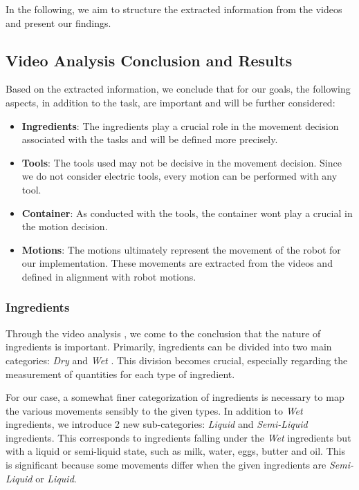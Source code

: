 In the following, we aim to structure the extracted information from the videos and present our findings.

\subsection{Video Analysis Conclusion and Results}

Based on the extracted information, we conclude that for our goals, the following aspects, in addition to the task, are important and will be further considered:
\begin{itemize}
  \item \textbf{Ingredients}: The ingredients play a crucial role in the movement decision associated with the tasks and will be defined more precisely.
  \item \textbf{Tools}: The tools used may not be decisive in the movement decision. Since we do not consider electric tools, every motion can be performed with any tool.
  \item \textbf{Container}: As conducted with the tools, the container wont play a crucial in the motion decision. 
  \item \textbf{Motions}: The motions ultimately represent the movement of the robot for our implementation. These movements are extracted from the videos and defined in alignment with robot motions.
\end{itemize}

\subsubsection{Ingredients}
Through the video analysis , we come to the conclusion that the nature of ingredients is important. 
Primarily, ingredients can be divided into two main categories: \textit{Dry} and \textit{Wet} \cite{Ohene2017}. 
This division becomes crucial, especially regarding the measurement of quantities for each type of ingredient.

For our case, a somewhat finer categorization of ingredients is necessary to map the various movements sensibly to the given types. 
In addition to \textit{Wet} ingredients, we introduce 2 new sub-categories: \textit{Liquid} and \textit{Semi-Liquid} ingredients. 
This corresponds to ingredients falling under the \textit{Wet} ingredients but with a liquid or semi-liquid state, such as milk, water, eggs, butter and oil. 
This is significant because some movements differ when the given ingredients are \textit{Semi-Liquid} or \textit{Liquid}.

